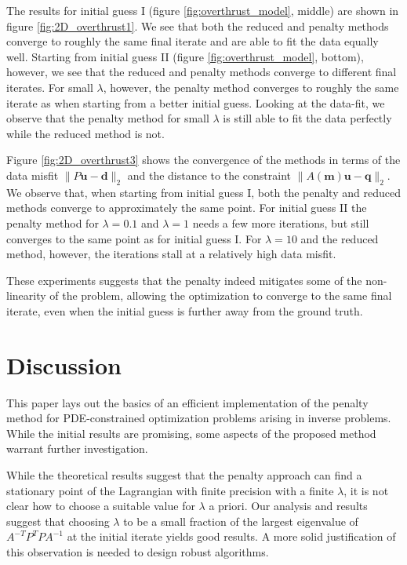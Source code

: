 \documentclass{iopart}
\begin{document}
The results for initial guess I (figure \ref{fig:overthrust_model}, middle) are shown in figure \ref{fig:2D_overthrust1}. We see that both the reduced and penalty methods converge to roughly the same final iterate and are able to fit the data equally well. Starting from initial guess II (figure \ref{fig:overthrust_model}, bottom), however, we see that the reduced and penalty methods converge to different final iterates. For small $\lambda$, however, the penalty method converges to roughly the same iterate as when starting from a better initial guess. Looking at the data-fit, we observe that the penalty method for small $\lambda$ is still able to fit the data perfectly while the reduced method is not.

Figure \ref{fig:2D_overthrust3} shows the convergence of the methods in terms of the data misfit $\|P\mathbf{u} - \mathbf{d}\|_2$ and the distance to the constraint $\|A(\mathbf{m})\mathbf{u} - \mathbf{q}\|_2$. We observe that, when starting from initial guess I, both the penalty and reduced methods converge to approximately the same point. For initial guess II the penalty method for $\lambda=0.1$ and $\lambda=1$ needs a few more iterations, but still converges to the same point as for initial guess I. For $\lambda=10$ and the reduced method, however, the iterations stall at a relatively high data misfit.

These experiments suggests that the penalty indeed mitigates some of the non-linearity of the problem, allowing the optimization to converge to the same final iterate, even when the initial guess is further away from the ground truth.

\section{Discussion}
\label{discussion}
This paper lays out the basics of an efficient implementation of the penalty method for PDE-constrained optimization problems arising in inverse problems. While the initial results are promising, some aspects of the proposed method warrant further investigation.

While the theoretical results suggest that the penalty approach can find a stationary point of the Lagrangian with finite precision with a finite $\lambda$, it is not clear how to choose a suitable value for $\lambda$ a priori. Our analysis and results suggest that choosing $\lambda$ to be a small fraction of the largest eigenvalue of $A^{-T}P^T\!PA^{-1}$ at the initial iterate yields good results. A more solid justification of this observation is needed to design robust algorithms.
\end{document}
